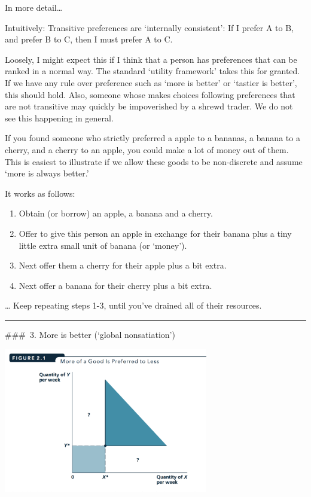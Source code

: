 \documentclass[]{article}
\begin{document}
\bigskip

In more detail\ldots{}

Intuitively: Transitive preferences are `internally consistent': If I prefer A to B, and prefer B to C, then I must prefer A to C.

\bigskip

Loosely, I might expect this if I think that a person has preferences that can be ranked in a normal way. The standard `utility framework' takes this for granted. If we have any rule over preference such as `more is better' or `tastier is better', this should hold. Also, someone whose makes choices following preferences that are not transitive may quickly be impoverished by a shrewd trader. We do not see this happening in general.

\bigskip

If you found someone who strictly preferred a apple to a bananas, a banana to a cherry, and a cherry to an apple, you could make a lot of money out of them. This is easiest to illustrate if we allow these goods to be non-discrete and assume `more is always better.'

\bigskip

It works as follows:

\begin{enumerate}
\def\labelenumi{\arabic{enumi}.}
\setcounter{enumi}{-1}
\item
  Obtain (or borrow) an apple, a banana and a cherry.
\item
  Offer to give this person an apple in exchange for their banana plus a tiny little extra small unit of banana (or `money').
\item
  Next offer them a cherry for their apple plus a bit extra.
\item
  Next offer a banana for their cherry plus a bit extra.
\end{enumerate}

\ldots{} Keep repeating steps 1-3, until you've drained all of their resources.

\begin{center}\rule{0.5\linewidth}{\linethickness}\end{center}

\#\#\#~3. More is better (`global nonsatiation')

\includegraphics[height=2.5in]{picsfigs/moreisbetter.png}
\end{document}

